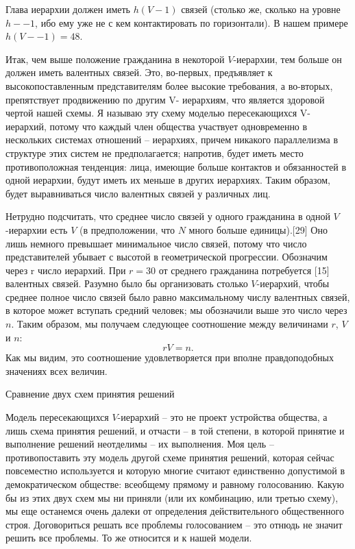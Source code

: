 \documentclass{book}
\begin{document}
Глава иерархии должен иметь $h(V-1)$  связей (столько же, сколько на уровне $h -- 1$, ибо ему уже не с кем контактировать по горизонтали). В нашем примере $h (V -- 1) = 48$.

Итак, чем выше положение гражданина в некоторой $V$-иерар­хии, тем больше он должен иметь валентных связей. Это, во-первых, предъявляет к высокопоставленным представителям более высокие требования, а во-вторых, препятствует продви­жению по другим V-  иерархиям, что является здоровой чертой нашей схемы. Я называю эту схему моделью пересекающихся V-  иерархий, потому что каждый член общества участвует од­новременно в нескольких системах отношений -- иерархиях, причем никакого параллелизма в структуре этих систем не предполагается; напротив, будет иметь место противоположная тенденция: лица, имеющие больше контактов и обязанностей в одной иерархии, будут иметь их меньше в других иерархиях. Таким образом, будет выравниваться число валентных связей у различных лиц.

Нетрудно подсчитать, что среднее число связей у одного гражданина в одной $V$-иерархии есть $V$ (в предположении, что $N$ много больше единицы).[29] Оно лишь немного превышает мини­мальное число связей, потому что число представителей убывает с высотой в геометрической прогрессии. Обозначим через r  число иерархий. При $r= 30$  от среднего гражданина потребуется [15] валент­ных связей. Разумно было бы организовать столько $V$-иерар­хий, чтобы среднее полное число связей было равно максималь­ному числу валентных связей, в которое может вступать средний человек; мы обозначили выше это число через $n$.  Таким обра­зом, мы получаем следующее соотношение между величинами $r$, $V$ и $n$: 
\[
	rV=n.
\]
Как мы видим, это соотношение удовлетворяется при вполне правдоподобных значениях всех величин.

Сравнение двух схем принятия решений

Модель пересекающихся $V$-иерархий -- это не проект устройст­ва общества, а лишь схема принятия решений, и отчасти -- в той степени, в которой принятие и выполнение решений неотделимы -- их выполнения. Моя цель -- противопоставить эту мо­дель другой схеме принятия решений, которая сейчас повсеместно используется и которую многие считают единственно допустимой в демократическом обществе: всеобщему прямому и равному голосованию. Какую бы из этих двух схем мы ни приняли (или их комбинацию, или третью схему), мы еще останемся очень далеки от определения действительного общественного строя. Договориться решать все проблемы голосованием -- это отнюдь не значит решить все проблемы. То же относится и к нашей мо­дели.
\end{document}
